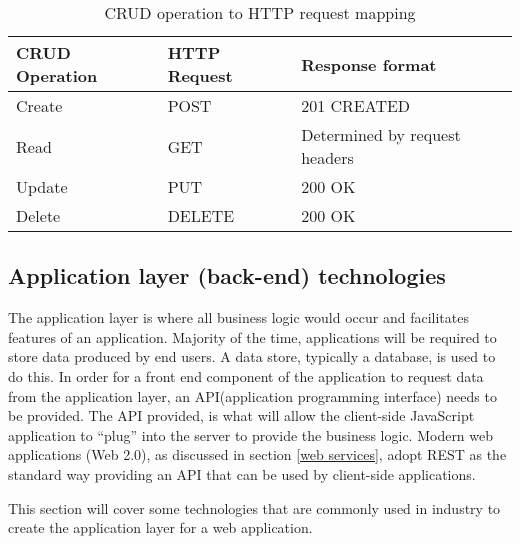 \begin{table} [h]
    \begin{center}
        \begin{tabular}{ |l|l|l| }
            \hline
            CRUD Operation & HTTP Request & Response format\\
            \hline
            Create & POST & 201 CREATED\\ 
            Read & GET & Determined by request headers\\  
            Update & PUT & 200 OK \\   
            Delete & DELETE & 200 OK \\
            \hline
        \end{tabular}
        \caption{CRUD operation to HTTP request mapping}
        \label{Table:1}
    \end{center}           
\end{table}

\subsection{Application layer (back-end) technologies}
The application layer is where all business logic would occur and facilitates features of an application.
Majority of the time, applications will be required to store data produced by end users. A data store, typically a database, is
used to do this.
In order for a front end component of the application to request data from the application layer, an API(application programming interface) needs
to be provided. The API provided, is what will allow the client-side JavaScript application to ``plug'' into the server to provide the business
logic. 
Modern web applications (Web 2.0), as discussed in section \ref{web services}, adopt REST as the standard way providing an API that can be used
by client-side applications.


This section will cover some technologies that are commonly used in industry to create the application layer for a web application.


